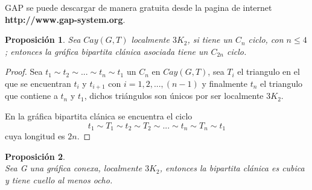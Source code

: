 \documentclass[12pt]{book}
\newtheorem{proposition}{Proposición}
\theoremstyle{definition}
\begin{document}
GAP se puede descargar de manera gratuita desde la pagina de internet \textbf{http://www.gap-system.org}.



\begin{proposition}\label{2nciclo}
  Sea $Cay(G,T)$ localmente $3K_2$, si tiene un $C_n$ ciclo, con $n\le
  4$; entonces la gráfica bipartita clánica asociada tiene un $C_{2n}$
  ciclo.
\end{proposition}

\begin{proof} Sea $t_1\sim t_2\sim ... \sim t_n \sim t_1$ un $C_n$ en
$Cay(G,T)$, sea $T_i$ el triangulo en el que se encuentran $t_i$ y
$t_{i+1}$ con $i=1,2,...,(n-1)$ y finalmente $t_n$ el triangulo que
contiene a $t_n$ y $t_1$, dichos triángulos son únicos por ser
localmente $3K_2$.

En la gráfica bipartita clánica se encuentra el ciclo
$$t_1\sim T_1\sim t_2 \sim T_2 \sim ... \sim t_n \sim T_n \sim t_1$$
cuya longitud es $2n$.
\end{proof}

\begin{proposition}\textbf{}\\
  Sea G una gráfica conexa, localmente $3K_2$, entonces la bipartita
  clánica es cubica y tiene cuello al menos ocho.\label{cuello8omas}
\end{proposition}
\end{document}

